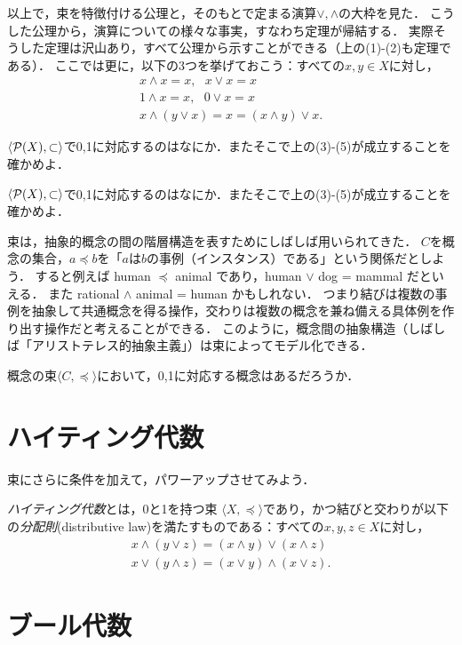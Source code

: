 \documentclass[11pt,a4paper]{jsarticle}
\begin{document}
以上で，束を特徴付ける公理と，そのもとで定まる演算$\vee, \wedge$の大枠を見た．
こうした公理から，演算についての様々な事実，すなわち定理が帰結する．
実際そうした定理は沢山あり，すべて公理から示すことができる（上の(1)-(2)も定理である）．
ここでは更に，以下の3つを挙げておこう：すべての$x, y \in X$に対し，
\begin{align}
 x \wedge x = x, \ \ \ x \vee x = x \\
 1 \wedge x = x, \ \ \ 0 \vee x = x \\
 x \wedge (y \vee x) = x = (x \wedge y) \vee x .
\end{align}

\begin{exercise}
 $\langle \mathcal{P}(X), \subset \rangle$で0,1に対応するのはなにか．またそこで上の(3)-(5)が成立することを確かめよ．
\end{exercise}


\begin{exercise}
 $\langle \mathcal{P}(X), \subset \rangle$で0,1に対応するのはなにか．またそこで上の(3)-(5)が成立することを確かめよ．
\end{exercise}

\begin{example}
束は，抽象的概念の間の階層構造を表すためにしばしば用いられてきた．
$C$を概念の集合，$a \preceq b$を「$a$は$b$の事例（インスタンス）である」という関係だとしよう．
すると例えば human $\preceq$ animal であり，human $\vee$ dog = mammal だといえる．
また rational $\wedge$ animal = human かもしれない．
つまり結びは複数の事例を抽象して共通概念を得る操作，交わりは複数の概念を兼ね備える具体例を作り出す操作だと考えることができる．
このように，概念間の抽象構造（しばしば「アリストテレス的抽象主義」）は束によってモデル化できる．
\end{example}

\begin{exercise}
概念の束$\langle C, \preceq \rangle$において，0,1に対応する概念はあるだろうか．
\end{exercise}



\section{ハイティング代数}

束にさらに条件を加えて，パワーアップさせてみよう．

\begin{dfn}[ハイティング代数]
\emph{ハイティング代数}とは，0と1を持つ束 $\langle X, \preceq \rangle$であり，かつ結びと交わりが以下の\emph{分配則}(distributive law)を満たすものである：すべての$x, y, z \in X$に対し，
\begin{align}
 x \wedge (y \vee z) = (x \wedge y) \vee (x \wedge z) \\
 x \vee (y \wedge z) = (x \vee y) \wedge (x \vee z) .
\end{align}
\end{dfn}




\section{ブール代数}
\end{document}
